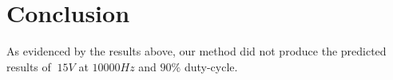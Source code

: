 \section{Conclusion}
As evidenced by the results above, our method did not produce the predicted results of $~15V$ at $10 000Hz$ and $90\%$ duty-cycle.
